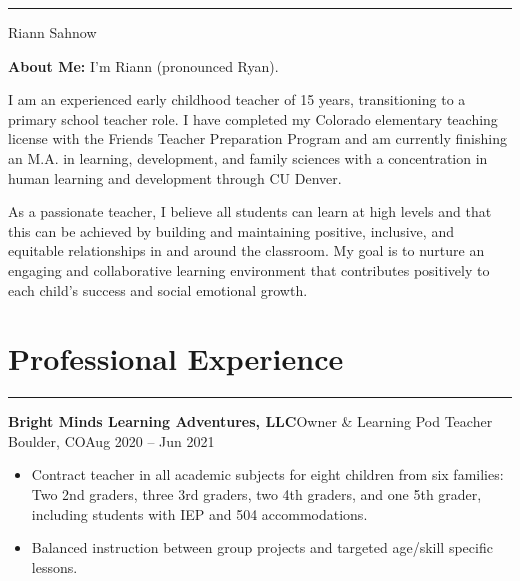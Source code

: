 \documentclass[letterpaper,10pt]{article}
\newcommand{\mblue}{\color{darkblue}}
\begin{document}
\pagestyle{empty}

{\mblue\rule{4.63in}{0.08cm}}

\vspace{-1.0pc}
\hfill{\Huge\mblue Riann Sahnow}

\vspace{2pc}

\textbf{About Me:} I'm Riann (pronounced Ryan).

\vspace{1pc}\qquad\qquad I am an experienced early childhood teacher of 15 years, transitioning to a primary school teacher role. I have completed my Colorado elementary teaching license
with the Friends Teacher Preparation Program and am currently finishing an M.A. in learning, development, and family sciences with a concentration in human learning and development through CU Denver.

\vspace{1pc}\qquad\qquad As a passionate teacher, I believe all students can learn at high levels and that this can be achieved by building and maintaining positive, inclusive, and
equitable relationships in and around the classroom. My goal is to nurture an engaging and collaborative learning environment that contributes positively to each child's success and
social emotional growth.

\section*{\mblue Professional Experience}

\vspace{-2.15pc}
{\hfill\mblue\rule{4.615in}{0.02cm}}

\vspace{1pc}
\textbf{Bright Minds Learning Adventures, LLC}\hfill Owner \& Learning Pod Teacher
\smallbreak Boulder, CO\hfill Aug 2020 -- Jun 2021

\begin{itemize}
    \item Contract teacher in all academic subjects for eight children from six families: Two 2nd graders, three 3rd graders, two 4th graders, and one 5th grader, including students with IEP and 504 accommodations.
    \item Balanced instruction between group projects and targeted age/skill specific lessons.
\end{itemize}
\end{document}

